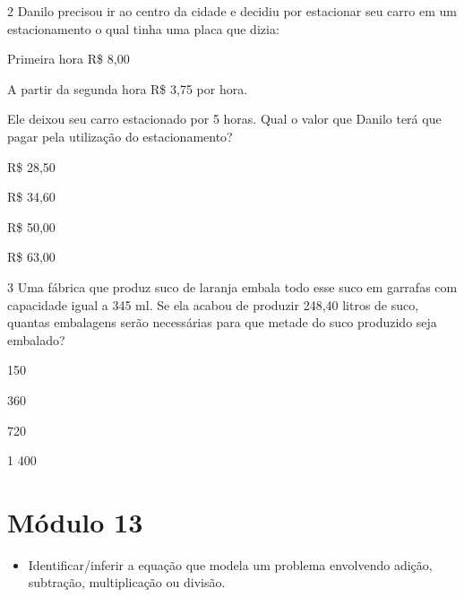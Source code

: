 
\num{2} Danilo precisou ir ao centro da cidade e decidiu por estacionar seu
carro em um estacionamento o qual tinha uma placa que dizia:

Primeira hora R\$ 8,00

A partir da segunda hora R\$ 3,75 por hora.


Ele deixou seu carro estacionado por 5 horas. Qual o valor que Danilo
terá que pagar pela utilização do estacionamento?

\begin{escolha}
\item
  R\$ 28,50
\item
  R\$ 34,60
\item
  R\$ 50,00
\item
  R\$ 63,00
\end{escolha}


\num{3} Uma fábrica que produz suco de laranja embala todo esse suco em
garrafas com capacidade igual a 345 ml. Se ela acabou de produzir 248,40
litros de suco, quantas embalagens serão necessárias para que metade do
suco produzido seja embalado?

\begin{escolha}
\item
  150
\item
  360
\item
  720
\item
  1 400
\end{escolha}


\chapter{Módulo 13}


\begin{itemize}
\item Identificar/inferir a equação que modela um problema envolvendo
adição, subtração, multiplicação ou divisão.
\end{itemize}

